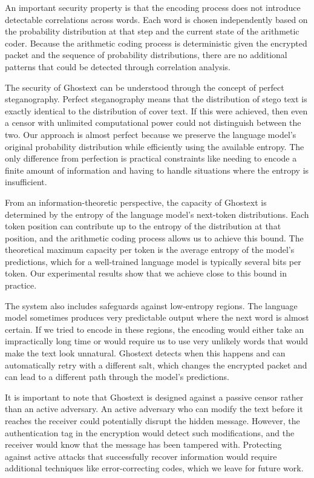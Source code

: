 \documentclass[sigconf,review,anonymous]{acmart}
\begin{document}
{An important security property is that the encoding process does not introduce detectable correlations across words. Each word is chosen independently based on the probability distribution at that step and the current state of the arithmetic coder. Because the arithmetic coding process is deterministic given the encrypted packet and the sequence of probability distributions, there are no additional patterns that could be detected through correlation analysis.

The security of Ghostext can be understood through the concept of perfect steganography. Perfect steganography means that the distribution of stego text is exactly identical to the distribution of cover text. If this were achieved, then even a censor with unlimited computational power could not distinguish between the two. Our approach is almost perfect because we preserve the language model's original probability distribution while efficiently using the available entropy. The only difference from perfection is practical constraints like needing to encode a finite amount of information and having to handle situations where the entropy is insufficient.

From an information-theoretic perspective, the capacity of Ghostext is determined by the entropy of the language model's next-token distributions. Each token position can contribute up to the entropy of the distribution at that position, and the arithmetic coding process allows us to achieve this bound. The theoretical maximum capacity per token is the average entropy of the model's predictions, which for a well-trained language model is typically several bits per token. Our experimental results show that we achieve close to this bound in practice.

The system also includes safeguards against low-entropy regions. The language model sometimes produces very predictable output where the next word is almost certain. If we tried to encode in these regions, the encoding would either take an impractically long time or would require us to use very unlikely words that would make the text look unnatural. Ghostext detects when this happens and can automatically retry with a different salt, which changes the encrypted packet and can lead to a different path through the model's predictions.

It is important to note that Ghostext is designed against a passive censor rather than an active adversary. An active adversary who can modify the text before it reaches the receiver could potentially disrupt the hidden message. However, the authentication tag in the encryption would detect such modifications, and the receiver would know that the message has been tampered with. Protecting against active attacks that successfully recover information would require additional techniques like error-correcting codes, which we leave for future work.

}
\end{document}
